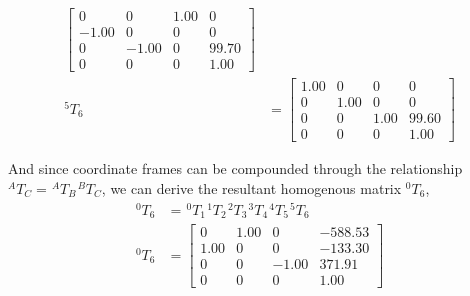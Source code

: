 \begin{equation*}
\begin{split}
\begin{bmatrix}
                          0     & 0     & 1.00 & 0     \\
                          -1.00 & 0     & 0    & 0     \\
                          0     & -1.00 & 0    & 99.70 \\
                          0     & 0     & 0    & 1.00
                      \end{bmatrix}    \\
        ^{5}T_{6} & = \begin{bmatrix}
                          1.00 & 0    & 0    & 0     \\
                          0    & 1.00 & 0    & 0     \\
                          0    & 0    & 1.00 & 99.60 \\
                          0    & 0    & 0    & 1.00
                      \end{bmatrix}
    \end{split}
\end{equation*}

And since coordinate frames can be compounded through the relationship $^{A}T_{C} =\hspace{1pt} ^{A}T_{B} \hspace{1pt} ^{B}T_{C}$, we can derive the resultant homogenous matrix $^{0}T_{6}$,
\begin{equation*}
    \begin{split}
        ^{0}T_{6} & = \hspace{1pt} ^{0}T_{1} \hspace{1pt} ^{1}T_{2}\hspace{1pt} ^{2}T_{3}\hspace{1pt} ^{3}T_{4}\hspace{1pt} ^{4}T_{5}\hspace{1pt} ^{5}T_{6} \\
        ^{0}T_{6} & = \begin{bmatrix}
                          0    & 1.00 & 0     & -588.53 \\
                          1.00 & 0    & 0     & -133.30 \\
                          0    & 0    & -1.00 & 371.91  \\
                          0    & 0    & 0     & 1.00
                      \end{bmatrix}
    \end{split}
\end{equation*}

